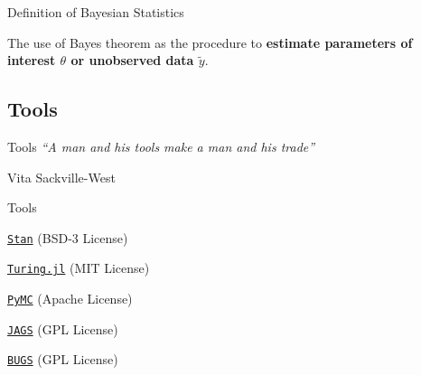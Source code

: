 \begin{frame}{Definition of Bayesian Statistics}
	\begin{defn}
		The use of Bayes theorem as the procedure to \textbf{estimate
			parameters of interest $\theta$ or unobserved data $\tilde{y}$}.
		\parencite{gelman2013bayesian}
	\end{defn}
\end{frame}

\subsection{Tools}
\begin{frame}{Tools}
	\centering
	\textit{``A man and his tools make a man and his trade''}

	\vspace{2ex}

	Vita Sackville-West
\end{frame}

\begin{frame}{Tools}
	\begin{vfilleditems}
		\item \LARGE  \href{https://mc-stan.org}{\texttt{Stan}} (BSD-3 License)
		\item \LARGE  \href{https://turing.ml}{\texttt{Turing.jl}} (MIT License)
		\item \href{https://www.pymc.io/}{\texttt{PyMC}} (Apache License)
		\item \small \href{https://mcmc-jags.sourceforge.io/}{\texttt{JAGS}} (GPL License)
		\item \footnotesize \href{https://www.mrc-bsu.cam.ac.uk/software/bugs/}{\texttt{BUGS}} (GPL License)
	\end{vfilleditems}
\end{frame}

